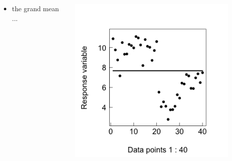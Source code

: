 \documentclass{beamer}
\begin{document}
\begin{frame}{}
  \begin{columns}[onlytextwidth] %
    \begin{column}{0.44\textwidth}
  \begin{itemize}
    \item the grand mean ...
  \end{itemize}
    \end{column}
    \hspace{0.02\textwidth} %
    \begin{column}{0.6\textwidth}
      \begin{center}
        \includegraphics[width=0.9\textwidth]{lectures/day_1_intro_to_mems/figures/unnamed-chunk-18-1.png}
      \end{center}
    \end{column}
  \end{columns}
\end{frame}
\end{document}
